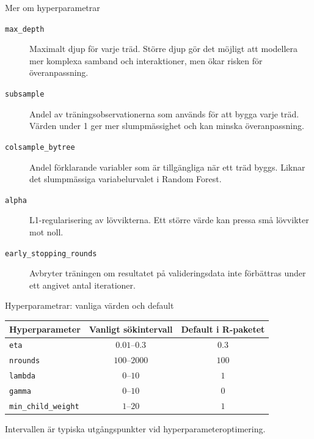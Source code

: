 \documentclass[10pt,english]{beamer}
\begin{document}
\begin{frame}{Mer om hyperparametrar}

\begin{description}

  \item[\texttt{max\_depth}]
  Maximalt djup för varje träd.
  Större djup gör det möjligt att modellera mer komplexa samband och
  interaktioner, men ökar risken för överanpassning.

  \item[\texttt{subsample}]
  Andel av träningsobservationerna som används för att bygga varje träd.
  Värden under 1 ger mer slumpmässighet och kan minska överanpassning.

  \item[\texttt{colsample\_bytree}]
  Andel förklarande variabler som är tillgängliga när ett träd byggs.
  Liknar det slumpmässiga variabelurvalet i Random Forest.

  \item[\texttt{alpha}]
  L1-regularisering av lövvikterna.
  Ett större värde kan pressa små lövvikter mot noll.

  \item[\texttt{early\_stopping\_rounds}]
  Avbryter träningen om resultatet på valideringsdata inte förbättras
  under ett angivet antal iterationer.

\end{description}

\end{frame}


\begin{frame}{Hyperparametrar: vanliga värden och default}

  \centering
  \small

  \begin{tabular}{lcc}
    \hline
    \textbf{Hyperparameter}
      & \textbf{Vanligt sökintervall}
      & \textbf{Default i R-paketet} \\
    \hline
    \texttt{eta}
      & $0.01$--$0.3$
      & $0.3$ \\
    \texttt{nrounds}
      & $100$--$2000$
      & $100$ \\
    \texttt{lambda}
      & $0$--$10$
      & $1$ \\
    \texttt{gamma}
      & $0$--$10$
      & $0$ \\
    \texttt{min\_child\_weight}
      & $1$--$20$
      & $1$ \\
    \hline
  \end{tabular}

  \vspace{0.5cm}

  \footnotesize
  Intervallen är typiska utgångspunkter vid
  hyperparameteroptimering.

\end{frame}
\end{document}
